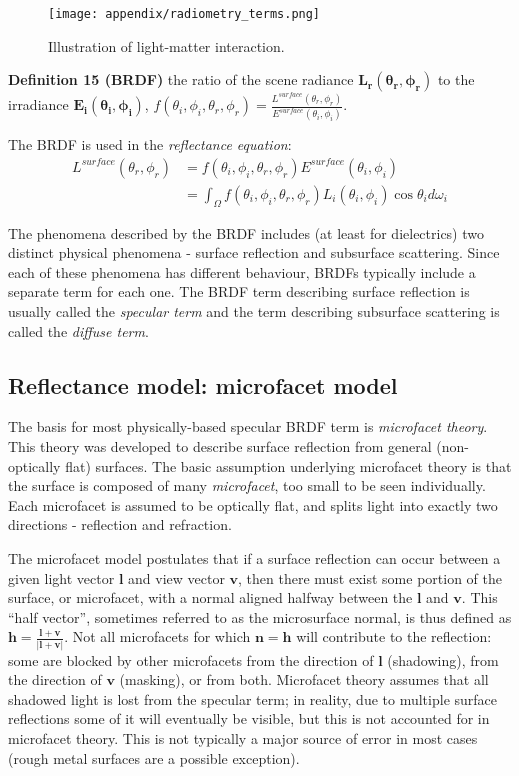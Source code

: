 \begin{figure}[!htbp]
\centering
\texttt{[image: appendix/radiometry\_terms.png]}
\caption{Illustration of light-matter interaction.}
\label{fig:radiometry_terms}
\end{figure}

\noindent\textbf{Definition 15 (BRDF)} the ratio of the scene radiance $\mathbf{L_r(\theta_r, \phi_r)}$ to the irradiance $\mathbf{E_i(\theta_i, \phi_i)}$, \ie $f(\theta_i, \phi_i, \theta_r, \phi_r)=\frac{L^{surface}(\theta_r, \phi_r)}{E^{surface}(\theta_i, \phi_i)}$.

The BRDF is used in the \textit{reflectance equation}:
\begin{align*}
L^{surface}(\theta_r, \phi_r)&=f(\theta_i, \phi_i, \theta_r, \phi_r)E^{surface}(\theta_i, \phi_i)\\
&= \int_\Omega f(\theta_i, \phi_i, \theta_r, \phi_r) L_i(\theta_i, \phi_i) \cos\theta_i d\omega_i
\end{align*}

The phenomena described by the BRDF includes (at least for dielectrics) two distinct physical phenomena - surface reflection and subsurface scattering. Since each of these phenomena has different behaviour, BRDFs typically include a separate term for each one. The BRDF term describing surface reflection is usually called the \textit{specular term} and the term describing subsurface scattering is called the \textit{diffuse term}.

\subsection{Reflectance model: microfacet model}
\label{sec:microfacet_model}
The basis for most physically-based specular BRDF term is \textit{microfacet theory}. This theory was developed to describe surface reflection from general (non-optically flat) surfaces. The basic assumption underlying microfacet theory is that the surface is composed of many \textit{microfacet}, too small to be seen individually. Each microfacet is assumed to be optically flat, and splits light into exactly two directions - reflection and refraction.

The microfacet model postulates that if a surface reflection can occur between a given light vector $\mathbf{l}$ and view vector $\mathbf{v}$, then there must exist some portion of the surface, or microfacet, with a normal aligned halfway between the $\mathbf{l}$ and $\mathbf{v}$. This ``half vector'', sometimes referred to as the microsurface normal, is thus defined as $\mathbf{h}=\frac{\mathbf{l}+\mathbf{v}}{|\mathbf{l}+\mathbf{v}|}$. Not all microfacets for which $\mathbf{n}=\mathbf{h}$ will contribute to the reflection: some are blocked by other microfacets from the direction of $\mathbf{l}$ (shadowing), from the direction of $\mathbf{v}$ (masking), or from both. Microfacet theory assumes that all shadowed light is lost from the specular term; in reality, due to multiple surface reflections some of it will eventually be visible, but this is not accounted for in microfacet theory. This is not typically a major source of error in most cases (rough metal surfaces are a possible exception).

